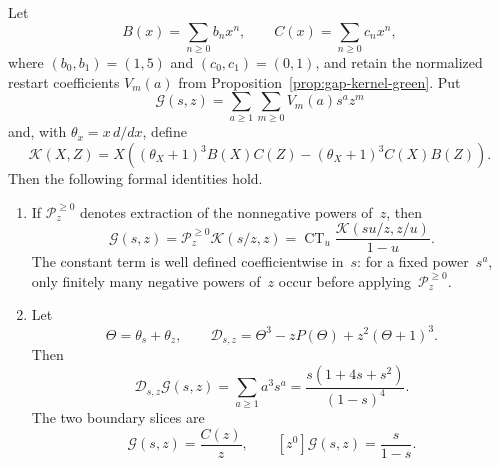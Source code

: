 \begin{proposition}
\label{prop:gap-kernel-bivariate}
Let
\[
 B(x)=\sum_{n\geq0}b_nx^n,
 \qquad
 C(x)=\sum_{n\geq0}c_nx^n,
\]
where $(b_0,b_1)=(1,5)$ and $(c_0,c_1)=(0,1)$, and retain the
normalized restart coefficients $V_m(a)$ from
Proposition~\ref{prop:gap-kernel-green}.  Put
\[
 \mathcal G(s,z)=\sum_{a\geq1}\sum_{m\geq0}V_m(a)s^az^m
\]
and, with \(\theta_x=x\,d/dx\), define
\begin{equation}
 \mathcal K(X,Z)
 =X\left(
   (\theta_X+1)^3B(X)C(Z)
   -(\theta_X+1)^3C(X)B(Z)
  \right).
 \label{eq:bivariate-K}
\end{equation}
Then the following formal identities hold.

\begin{enumerate}
\item If \(\mathcal P_z^{\geq0}\) denotes extraction of the nonnegative
  powers of~$z$, then
  \begin{equation}
   \boxed{
   \mathcal G(s,z)
    =\mathcal P_z^{\geq0}\mathcal K(s/z,z)
    =\operatorname{CT}_u
      \frac{\mathcal K(su/z,z/u)}{1-u}.}
   \label{eq:bivariate-positive-part}
  \end{equation}
  The constant term is well defined coefficientwise in~$s$: for a fixed
  power~$s^a$, only finitely many negative powers of~$z$ occur before
  applying~$\mathcal P_z^{\geq0}$.

\item Let
  \[
   \Theta=\theta_s+\theta_z,
   \qquad
   \mathscr D_{s,z}
    =\Theta^3-zP(\Theta)+z^2(\Theta+1)^3.
  \]
  Then
  \begin{equation}
   \boxed{
   \mathscr D_{s,z}\mathcal G(s,z)
    =\sum_{a\geq1}a^3s^a
    =\frac{s(1+4s+s^2)}{(1-s)^4}.}
   \label{eq:bivariate-PDE}
  \end{equation}
  The two boundary slices are
  \begin{equation}
   [s]\mathcal G(s,z)=\frac{C(z)}z,
   \qquad
   [z^0]\mathcal G(s,z)=\frac{s}{1-s}.
   \label{eq:bivariate-boundary-slices}
  \end{equation}
\end{enumerate}
\end{proposition}

